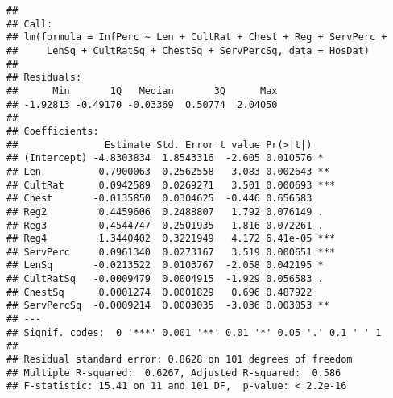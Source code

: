 \documentclass[]{article}
\newenvironment{Shaded}{\begin{snugshade}}{\end{snugshade}}
\newcommand{\KeywordTok}[1]{\textcolor[rgb]{0.13,0.29,0.53}{\textbf{#1}}}
\newcommand{\DataTypeTok}[1]{\textcolor[rgb]{0.13,0.29,0.53}{#1}}
\newcommand{\DecValTok}[1]{\textcolor[rgb]{0.00,0.00,0.81}{#1}}
\newcommand{\StringTok}[1]{\textcolor[rgb]{0.31,0.60,0.02}{#1}}
\newcommand{\OperatorTok}[1]{\textcolor[rgb]{0.81,0.36,0.00}{\textbf{#1}}}
\newcommand{\NormalTok}[1]{#1}
\begin{document}
\begin{Shaded}
\end{Shaded}

\begin{verbatim}
## 
## Call:
## lm(formula = InfPerc ~ Len + CultRat + Chest + Reg + ServPerc + 
##     LenSq + CultRatSq + ChestSq + ServPercSq, data = HosDat)
## 
## Residuals:
##      Min       1Q   Median       3Q      Max 
## -1.92813 -0.49170 -0.03369  0.50774  2.04050 
## 
## Coefficients:
##               Estimate Std. Error t value Pr(>|t|)    
## (Intercept) -4.8303834  1.8543316  -2.605 0.010576 *  
## Len          0.7900063  0.2562558   3.083 0.002643 ** 
## CultRat      0.0942589  0.0269271   3.501 0.000693 ***
## Chest       -0.0135850  0.0304625  -0.446 0.656583    
## Reg2         0.4459606  0.2488807   1.792 0.076149 .  
## Reg3         0.4544747  0.2501935   1.816 0.072261 .  
## Reg4         1.3440402  0.3221949   4.172 6.41e-05 ***
## ServPerc     0.0961340  0.0273167   3.519 0.000651 ***
## LenSq       -0.0213522  0.0103767  -2.058 0.042195 *  
## CultRatSq   -0.0009479  0.0004915  -1.929 0.056583 .  
## ChestSq      0.0001274  0.0001829   0.696 0.487922    
## ServPercSq  -0.0009214  0.0003035  -3.036 0.003053 ** 
## ---
## Signif. codes:  0 '***' 0.001 '**' 0.01 '*' 0.05 '.' 0.1 ' ' 1
## 
## Residual standard error: 0.8628 on 101 degrees of freedom
## Multiple R-squared:  0.6267, Adjusted R-squared:  0.586 
## F-statistic: 15.41 on 11 and 101 DF,  p-value: < 2.2e-16
\end{verbatim}
\end{document}
